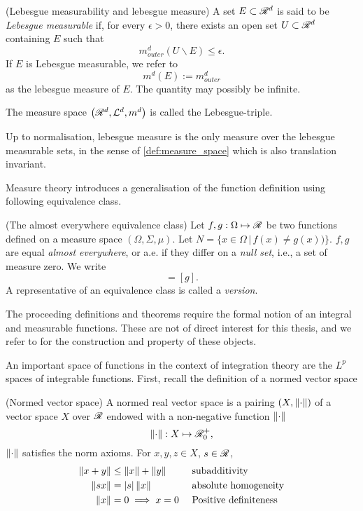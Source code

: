 \begin{definition}
\begin{definition}
\begin{definition} (Lebesgue measurability and lebesgue measure)
	A set $E \subset \mathscr{R}^d$ is said to be \emph{Lebesgue measurable} if, for every $\epsilon > 0$, there exists an open set $U \subset \mathscr{R}^d$ containing $E$ such that \[m^d_{outer}(U\backslash E) \leq \epsilon.\] If $E$ is Lebesgue measurable, we refer to \[m^d(E) := m^d_{outer}\] as the lebesgue measure of $E$. The quantity may possibly be infinite. 
	
	The measure space $\left(\mathscr{R}^d, \mathcal{L}^d, m^d\right)$ is called the Lebesgue-triple. 
\end{definition}

\begin{remark}
	Up to normalisation, lebesgue measure is the only measure over the lebesgue measurable sets, in the sense of \eqref{def:measure_space} which is also translation invariant. 
\end{remark}

Measure theory introduces a generalisation of the function definition using  following equivalence class. 

\begin{definition}(The almost everywhere equivalence class)
	Let $f,g : \Omega \mapsto \mathscr{R}$ be two functions defined on a measure space $(\Omega, \Sigma, \mu)$.  Let $N = \{x \in \Omega \, | \, f(x) \neq g(x)) \}$. $f,g$ are equal \emph{almost everywhere}, or a.e. if they differ on a \emph{null set}, i.e., a set of measure zero. 
	We write 
	\begin{equation}
		[f] = [g]. 
	\end{equation}
	A representative of an equivalence class is called a \emph{version}. 
\end{definition}

The proceeding definitions and theorems require the formal notion of an integral and measurable functions. These are not of direct interest for this thesis, and we refer to \cite{tao2011introduction} for the construction and property of these objects.

	
An important space of functions in the context of integration theory are the $L^p$ spaces of integrable functions. First, recall the definition of a normed vector space

\begin{definition}(Normed vector space)
	A normed real vector space is a pairing $(X, \left\lVert\cdot \right\rVert)$ of a vector space $X$ over $\mathscr{R}$ endowed with a non-negative function $\left\lVert\cdot\right\rVert$ 
	\begin{equation}
		\left\lVert\cdot\right\rVert : X \mapsto \mathscr{R}_0^+,  
	\end{equation}
	$\left\lVert\cdot\right\rVert$ satisfies the norm axioms. For $x,y,z \in X$, $s \in \mathscr{R}$, 
	\begin{align}
		\left\lVert x+y\right\rVert &\leq \left\lVert x\right\rVert + \left\lVert y\right\rVert \,\, &&\text{subadditivity} \\
		\left\lVert s x\right\rVert &= \left| s \right| \left\lVert x\right\rVert \ \,\, &&\text{absolute homogeneity} \\
		\left\lVert x\right\rVert &= 0 \implies x = 0  \,\, &&\text{Positive definiteness}
	\end{align}
\end{definition}


\end{definition}
\end{definition}
